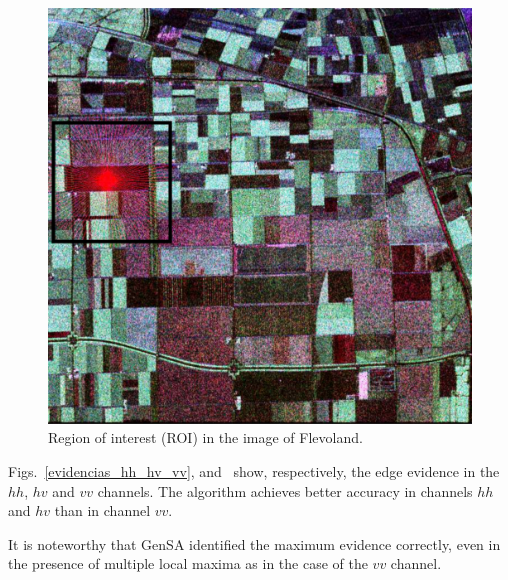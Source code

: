 \documentclass[a4paper,12pt]{article}
\begin{document}
\begin{figure}[hbt]
\centering
	\includegraphics[width=\linewidth]{flevoland_radial_4_look_black}
	\caption{Region of interest (ROI) in the image of Flevoland.}
\label{flevoland_radial_4look}
\end{figure}

Figs.~\ref{evidencias_hh_hv_vv},  and~ show, respectively, the edge evidence in the $hh$, $hv$ and $vv$ channels. 
The algorithm achieves better accuracy in channels $hh$ and $hv$ than in channel $vv$.  

It is noteworthy that GenSA identified the maximum evidence correctly, even in the presence of multiple local maxima as in the case of the $vv$ channel.
\end{document}
